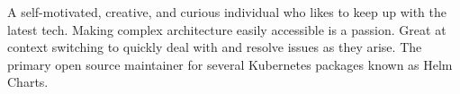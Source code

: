 \documentclass[10pt]{developercv} %
\begin{document}
\vspace{0.5cm}


\begin{minipage}[t]{0.45\textwidth} %
	\vspace{-\baselineskip} %

	A self-motivated, creative, and curious individual who likes to keep up with the latest
	tech. Making complex architecture easily accessible is a passion. Great at context switching
	to quickly deal with and resolve issues as they arise. The primary open source maintainer
	for several Kubernetes packages known as Helm Charts.\\
\end{minipage}
\hfill  %
\begin{minipage}[t]{0.45\textwidth} %
	\vspace{-\baselineskip} %
	\begin{barchart}{5.5}
	\end{barchart}
\end{minipage}



\end{document}
